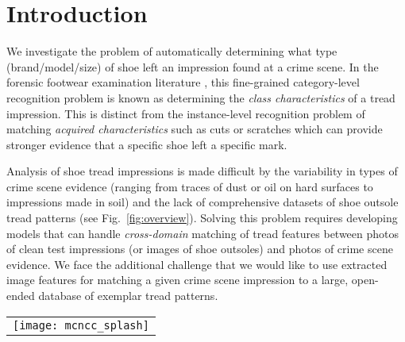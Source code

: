 \documentclass[twocolumn]{svjour3}           %
\begin{document}
\section{Introduction}

We investigate the problem of automatically determining what type
(brand/model/size) of shoe left an impression found at a crime scene. In the
forensic footwear examination literature \cite{bodziak1999footwear}, this
fine-grained category-level recognition problem is known as determining the
\textit{class characteristics} of a tread impression.  This is distinct from
the instance-level recognition problem of matching \textit{acquired
characteristics} such as cuts or scratches which can provide stronger evidence
that a specific shoe left a specific mark.

Analysis of shoe tread impressions is made difficult by the variability in
types of crime scene evidence (ranging from traces of dust or oil on hard
surfaces to impressions made in soil) and the lack of comprehensive datasets of
shoe outsole tread patterns  (see Fig.~\ref{fig:overview}). Solving this
problem requires developing models that can handle \textit{cross-domain}
matching of tread features between photos of clean test impressions (or images
of shoe outsoles) and photos of crime scene evidence.  We face the additional
challenge that we would like to use extracted image features for matching a
given crime scene impression to a large, open-ended database of exemplar tread
patterns.

\begin{figure*}[h]
\begin{center}
  \begin{tabular}{c}
  \texttt{[image: mcncc\_splash]}
  \end{tabular}\vspace{-2mm}
\end{center}
\caption{We would like to match crime scene prints to a database of test
impressions despite significant cross-domain differences in appearance. We
utilize a Siamese network to perform matching using a multi-channel normalized
cross correlation. We find that per-exemplar, per-channel normalization of
CNN feature maps significantly improves matching performance. Here $U$ and $V$
are the linear projection parameters for laboratory test impression and crime
scene photo domains respectively. $W$ is the per-channel importance weights.
And $x$ and $y$ are the projected features of each domain used for matching.}
  \label{fig:overview}
\end{figure*}
\end{document}
